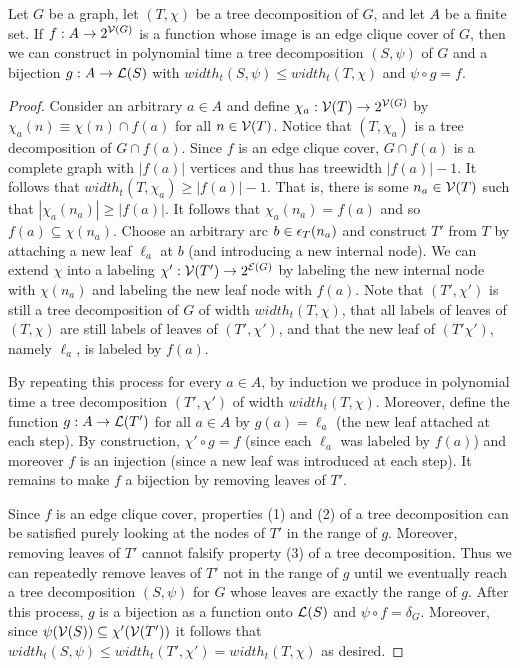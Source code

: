 \begin{lemma}\label{lemma:tree-simplification}
Let $G$ be a graph, let $(T, \chi)$ be a tree decomposition of $G$, and let $A$ be a finite set. If $f: A \rightarrow 2^{\mathcal{V}(G)}$ is a function whose image is an edge clique cover of $G$, then we can construct in polynomial time a tree decomposition $(S, \psi)$ of $G$ and a bijection $g: A \rightarrow \mathcal{L}(S)$ with $width_t(S, \psi) \leq width_t(T, \chi)$ and $\psi \circ g = f$.
\end{lemma}
\begin{proof}
Consider an arbitrary $a \in A$ and define $\chi_a: \mathcal{V}(T) \rightarrow 2^{\mathcal{V}(G)}$ by $\chi_a(n) \equiv \chi(n) \cap f(a)$ for all $n \in \mathcal{V}(T)$. Notice that $(T, \chi_a)$ is a tree decomposition of $G \cap f(a)$. Since $f$ is an edge clique cover, $G \cap f(a)$ is a complete graph with $|f(a)|$ vertices and thus has treewidth $|f(a)|-1$. It follows that $width_t(T, \chi_a) \geq |f(a)|-1$. That is, there is some $n_a \in \mathcal{V}(T)$ such that $|\chi_a(n_a)| \geq |f(a)|$. It follows that $\chi_a(n_a) = f(a)$ and so $f(a) \subseteq \chi(n_a)$. Choose an arbitrary arc $b \in \epsilon_{T}(n_a)$ and construct $T'$ from $T$ by attaching a new leaf $\ell_a$ at $b$ (and introducing a new internal node). We can extend $\chi$ into a labeling $\chi': \mathcal{V}(T') \rightarrow 2^{\mathcal{E}(G)}$ by labeling the new internal node with $\chi(n_a)$ and labeling the new leaf node with $f(a)$. Note that $(T', \chi')$ is still a tree decomposition of $G$ of width $width_t(T, \chi)$, that all labels of leaves of $(T, \chi)$ are still labels of leaves of $(T', \chi')$, and that the new leaf of $(T' \chi')$, namely $\ell_a$, is labeled by $f(a)$.

By repeating this process for every $a \in A$, by induction we produce in polynomial time a tree decomposition $(T', \chi')$ of width $width_t(T, \chi)$. Moreover, define the function $g: A \rightarrow \mathcal{L}(T')$ for all $a \in A$ by $g(a) = \ell_a$ (the new leaf attached at each step). By construction, $\chi' \circ g = f$ (since each $\ell_a$ was labeled by $f(a)$) and moreover $f$ is an injection (since a new leaf was introduced at each step). It remains to make $f$ a bijection by removing leaves of $T'$.

Since $f$ is an edge clique cover, properties (1) and (2) of a tree decomposition can be satisfied purely looking at the nodes of $T'$ in the range of $g$. Moreover, removing leaves of $T'$ cannot falsify property (3) of a tree decomposition. Thus we can repeatedly remove leaves of $T'$ not in the range of $g$ until we eventually reach a tree decomposition $(S, \psi)$ for $G$ whose leaves are exactly the range of $g$. After this process, $g$ is a bijection as a function onto $\mathcal{L}(S)$ and $\psi \circ f = \delta_G$. Moreover, since $\psi(\mathcal{V}(S)) \subseteq \chi'(\mathcal{V}(T'))$ it follows that $width_t(S, \psi) \leq width_t(T', \chi') = width_t(T, \chi)$ as desired.
\end{proof}

